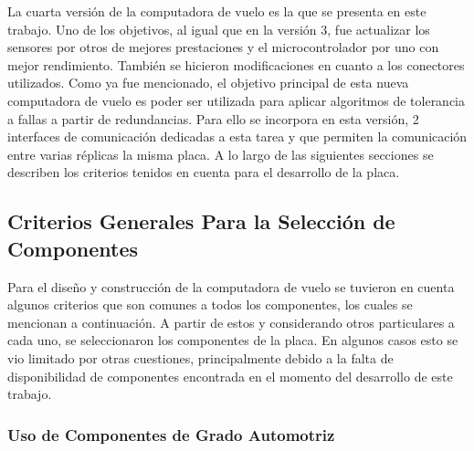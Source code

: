 La cuarta versión de la computadora de vuelo es la que se presenta en este trabajo. Uno de los objetivos, al igual que en la versión 3, fue actualizar los sensores por otros de mejores prestaciones y el microcontrolador por uno con mejor rendimiento. También se hicieron modificaciones en cuanto a los conectores utilizados. Como ya fue mencionado, el objetivo principal de esta nueva computadora de vuelo es poder ser utilizada para aplicar algoritmos de tolerancia a fallas a partir de redundancias. Para ello se incorpora en esta versión, 2 interfaces de comunicación dedicadas a esta tarea y que permiten la comunicación entre varias réplicas la misma placa. A lo largo de las siguientes secciones se describen los criterios tenidos en cuenta para el desarrollo de la placa.

\subsection{Criterios Generales Para la Selección de Componentes}


Para el diseño y construcción de la computadora de vuelo se tuvieron en cuenta algunos criterios que son comunes a todos los componentes, los cuales se mencionan a continuación. A partir de estos y considerando otros particulares a cada uno, se seleccionaron los componentes de la placa. En algunos casos esto se vio limitado por otras cuestiones, principalmente debido a la falta de disponibilidad de componentes encontrada en el momento del desarrollo de este trabajo.



\subsubsection{Uso de Componentes de Grado Automotriz}

